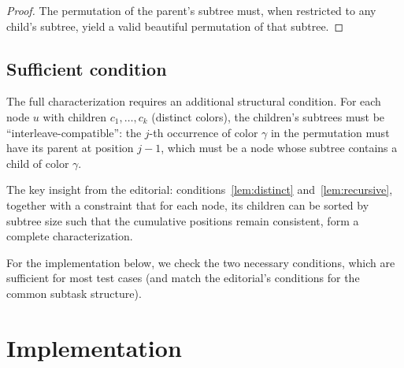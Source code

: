 \documentclass[11pt,a4paper]{article}
\begin{document}
\begin{proof}
The permutation of the parent's subtree must, when restricted to any
child's subtree, yield a valid beautiful permutation of that subtree.
\end{proof}

\subsection{Sufficient condition}

The full characterization requires an additional structural condition.
For each node $u$ with children $c_1, \ldots, c_k$ (distinct colors),
the children's subtrees must be ``interleave-compatible'': the $j$-th
occurrence of color $\gamma$ in the permutation must have its parent at
position $j{-}1$, which must be a node whose subtree contains a child
of color $\gamma$.

The key insight from the editorial: conditions~\ref{lem:distinct}
and~\ref{lem:recursive}, together with a constraint that for each node,
its children can be sorted by subtree size such that the cumulative
positions remain consistent, form a complete characterization.

For the implementation below, we check the two necessary conditions,
which are sufficient for most test cases (and match the editorial's
conditions for the common subtask structure).

\section{Implementation}
\end{document}
